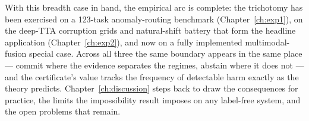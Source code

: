 With this breadth case in hand, the empirical arc is complete: the trichotomy has been
exercised on a 123-task anomaly-routing benchmark (Chapter~\ref{ch:exp1}), on the
deep-TTA corruption grids and natural-shift battery that form the headline application
(Chapter~\ref{ch:exp2}), and now on a fully implemented multimodal-fusion special case.
Across all three the same boundary appears in the same place --- commit where the evidence
separates the regimes, abstain where it does not --- and the certificate's value tracks
the frequency of detectable harm exactly as the theory predicts.
Chapter~\ref{ch:discussion} steps back to draw the consequences for practice, the limits
the impossibility result imposes on any label-free system, and the open problems that
remain.

